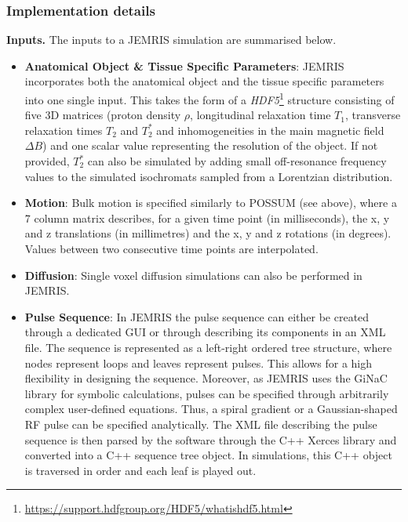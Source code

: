 \hfill

\subsubsection{Implementation details}

\textbf{Inputs.} The inputs to a JEMRIS simulation are summarised below.

\begin{itemize}
    
    \item \textbf{Anatomical Object \& Tissue Specific Parameters}: JEMRIS incorporates both the anatomical object and the tissue specific parameters into one single input.
    This takes the form of a \textit{HDF5}\footnote{\url{https://support.hdfgroup.org/HDF5/whatishdf5.html}} structure consisting of five 3D matrices (proton density $\rho$, longitudinal relaxation time $T_1$, transverse relaxation times $T_2$ and $T_2^*$ and inhomogeneities in the main magnetic field $\Delta B$) and one scalar value representing the resolution of the object.
    If not provided, $T_2^*$ can also be simulated by adding small off-resonance frequency values to the simulated isochromats sampled from a Lorentzian distribution. 

    \item \textbf{Motion}: Bulk motion is specified similarly to POSSUM (see above), where a 7 column matrix describes, for a given time point (in milliseconds), the x, y and z translations (in millimetres) and the x, y and z rotations (in degrees). 
    Values between two consecutive time points are interpolated. 
    
    \item \textbf{Diffusion}: Single voxel diffusion simulations can also be performed in JEMRIS. 
    
    \item \textbf{Pulse Sequence}: In JEMRIS the pulse sequence can either be created through a dedicated GUI or through describing its components in an XML file.
    The sequence is represented as a left-right ordered tree structure, where nodes represent loops and leaves represent pulses.
    This allows for a high flexibility in designing the sequence.
    Moreover, as JEMRIS uses the GiNaC library for symbolic calculations, pulses can be specified through arbitrarily complex user-defined equations.
    Thus, a spiral gradient or a Gaussian-shaped RF pulse can be specified analytically.
    The XML file describing the pulse sequence is then parsed by the software through the C++ Xerces library and converted into a C++ sequence tree object.
    In simulations, this C++ object is traversed in order and each leaf is played out.
    

\end{itemize}
